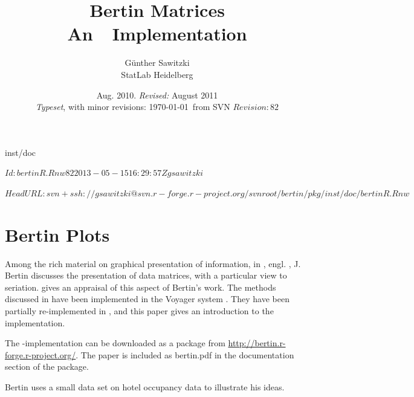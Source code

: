 \documentclass[nogin, dvips,12pt,a4paper,twoside]{amsart}
\title[Bertin Matrices]{Bertin Matrices\\\bigskip An\  \Rlogo \  Implementation}
\author[G\"unther Sawitzki]{G\"unther Sawitzki\\StatLab Heidelberg}
\date{Aug. 2010.
\emph{Revised:} August 2011\\
\emph{Typeset}, with minor revisions: \today\  from SVN $Revision: 82 $ \svnInfoDate}
\begin{document}
inst/doc

\svnInfo $Id: bertinR.Rnw 82 2013-05-15 16:29:57Z gsawitzki $ 

\svninfo $HeadURL: svn+ssh://gsawitzki@svn.r-forge.r-project.org/svnroot/bertin/pkg/inst/doc/bertinR.Rnw $
\maketitle

\begingroup
\setlength{\parskip}{0pt}
\tableofcontents
\endgroup

\section{Bertin Plots}

Among the rich material on graphical presentation of information, in \cite{brtn77gtg}, engl. \cite{seriation:Bertin:1999}, J. Bertin discusses the presentation of data matrices, with a particular view to seriation. \cite{seriation:Falguerolles:1997} gives an appraisal of this aspect of Bertin's work. The methods discussed in \cite{seriation:Falguerolles:1997} have been implemented in the Voyager system \cite{Sawitzki1996Extensible-Stat}. They have been partially re-implemented in \R{}, and this paper gives an introduction to the \R{} implementation.

The \R{}-implementation can be downloaded as a package  from \url{http://bertin.r-forge.r-project.org/}.  The paper \cite{seriation:Falguerolles:1997} is included as bertin.pdf in the documentation section of the package.

Bertin uses a small data set on hotel occupancy data to illustrate his ideas.
\end{document}
